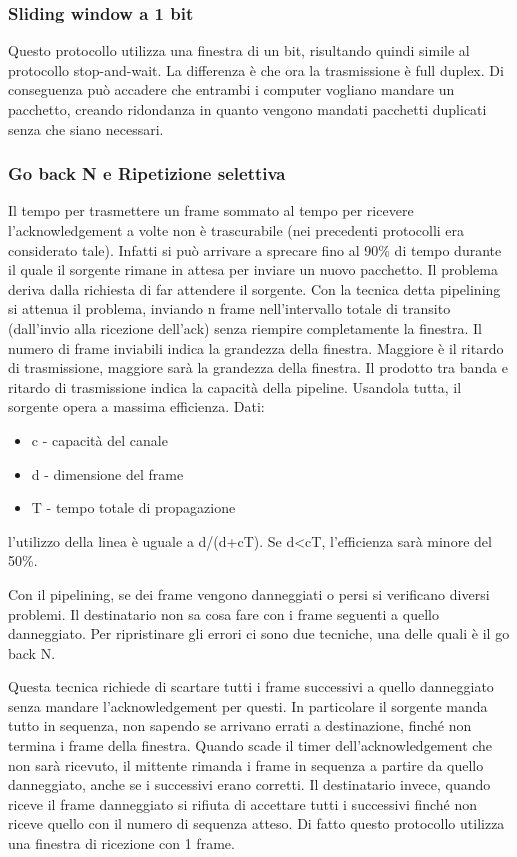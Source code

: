 \subsubsection{Sliding window a 1 bit}
Questo protocollo utilizza una finestra di un bit, risultando quindi simile al protocollo stop-and-wait.
La differenza è che ora la trasmissione è full duplex.
Di conseguenza può accadere che entrambi i computer vogliano mandare un pacchetto,
creando ridondanza in quanto vengono mandati pacchetti duplicati senza che siano necessari.

\subsubsection{Go back N e Ripetizione selettiva}
Il tempo per trasmettere un frame sommato al tempo per ricevere l'acknowledgement a volte non è trascurabile (nei precedenti protocolli era considerato tale).
Infatti si può arrivare a sprecare fino al 90\% di tempo durante il quale il sorgente rimane in attesa per inviare un nuovo pacchetto.
Il problema deriva dalla richiesta di far attendere il sorgente.
Con la tecnica detta pipelining si attenua il problema, 
inviando n frame nell'intervallo totale di transito (dall'invio alla ricezione dell'ack) senza riempire completamente la finestra.
Il numero di frame inviabili indica la grandezza della finestra.
Maggiore è il ritardo di trasmissione, maggiore sarà la grandezza della finestra.
Il prodotto tra banda e ritardo di trasmissione indica la capacità della pipeline.
Usandola tutta, il sorgente opera a massima efficienza.
Dati: 
\begin{itemize}
    \item c - capacità del canale
    \item d - dimensione del frame
    \item T - tempo totale di propagazione
\end{itemize}
l'utilizzo della linea è uguale a d/(d+cT).
Se d<cT, l'efficienza sarà minore del 50\%.

Con il pipelining, se dei frame vengono danneggiati o persi si verificano diversi problemi.
Il destinatario non sa cosa fare con i frame seguenti a quello danneggiato.
Per ripristinare gli errori ci sono due tecniche, una delle quali è il go back N.

Questa tecnica richiede di scartare tutti i frame successivi a quello danneggiato senza mandare l'acknowledgement per questi.
In particolare il sorgente manda tutto in sequenza, non sapendo se arrivano errati a destinazione, finché non termina i frame della finestra.
Quando scade il timer dell'acknowledgement che non sarà ricevuto, il mittente rimanda i frame in sequenza a partire da quello danneggiato,
anche se i successivi erano corretti.
Il destinatario invece, quando riceve il frame danneggiato si rifiuta di accettare tutti i successivi finché non riceve quello con il numero di sequenza atteso.
Di fatto questo protocollo utilizza una finestra di ricezione con 1 frame.

